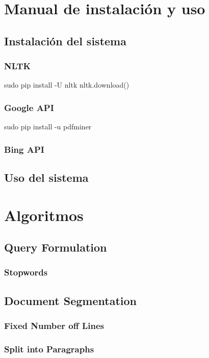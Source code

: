 \documentclass[12pt,a4paper,titlepage]{article}
\begin{document}
\clearpage
\section{Manual de instalación y uso}

\subsection{Instalación del sistema}

\subsubsection{NLTK}
sudo pip install -U nltk
nltk.download()

\subsubsection{Google API}

sudo pip install -u pdfminer

\subsubsection{Bing API}



\subsection{Uso del sistema}



\clearpage
\section{Algoritmos}
\subsection{Query Formulation}
\subsubsection{Stopwords}

\subsection{Document Segmentation}
\subsubsection{Fixed Number off Lines}
\subsubsection{Split into Paragraphs}
\end{document}
